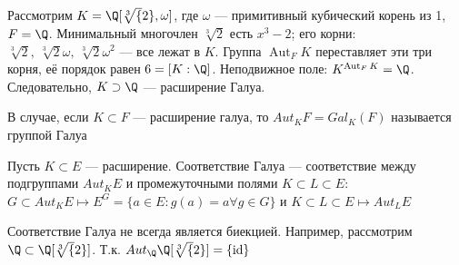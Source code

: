 \begin{example}
    Рассмотрим \(K = \Q[\sqrt[3]{2}, \omega]\), где \(\omega\) — примитивный кубический корень из 1, \(F = \Q\).  
    Минимальный многочлен \(\sqrt[3]{2}\) есть \(x^3-2\); его корни: \(\sqrt[3]{2},\ \sqrt[3]{2}\omega,\ \sqrt[3]{2}\omega^2\) — все лежат в \(K\).  
    Группа \(\operatorname{Aut}_F K\) переставляет эти три корня, её порядок равен \(6 = [K:\Q]\).  
    Неподвижное поле: \(K^{\operatorname{Aut}_F K} = \Q\).  
    Следовательно, \(K \supset \Q\) — расширение Галуа.
\end{example}


\begin{definition}
    В случае, если \(K \subset F\) --- расширение галуа, то \(Aut_KF = Gal_K(F)\) называется группой Галуа
\end{definition}

\begin{definition}
    Пусть \(K \subset E\) --- расширение. Соответствие Галуа --- соответствие между подгруппами \(Aut_KE\) и промежуточными полями \(K \subset L \subset E\): \(G \subset Aut_KE \mapsto E^G = \{a \in E: g(a) = a \forall g \in G\}\) и \(K \subset L \subset E \mapsto Aut_LE\)
\end{definition}

\begin{note}
    Соответствие Галуа не всегда является биекцией. Например, рассмотрим \(\Q \subset \Q[\sqrt[3]{2}]\). Т.к. \(Aut_{\Q}\Q[\sqrt[3]{2}] = \{\operatorname{id}\}\)
\end{note}

